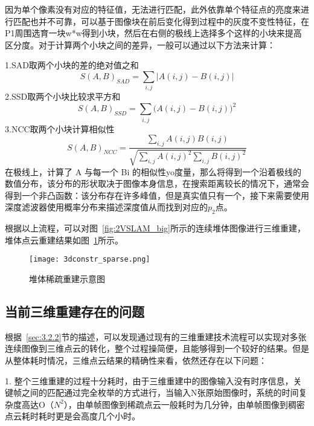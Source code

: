 因为单个像素没有对应的特征值，无法进行匹配，此外依靠单个特征点的亮度来进行匹配也并不可靠，可以基于图像块在前后变化得到过程中的灰度不变性特征，在P1周围选育一块w*w得到小块，然后在右侧的极线上选择多个这样的小块来提高区分度。对于计算两个小块之间的差异，一般可以通过以下方法来计算：

1.SAD取两个小块的差的绝对值之和
\begin{equation}
  S{(A,B)}_{SAD}=\sum_{i,j}\left|A(i,j)-B(i,j)\right|
\end{equation}
2.SSD取两个小块比较求平方和
\begin{equation}
S{(A,B)}_{SSD}=\sum_{i,j}(A(i,j)-B{(i,j))}^2
\end{equation}
3.NCC取两个小块计算相似性
\begin{equation}
  S{(A,B)}_{NCC}=\frac{{\displaystyle\sum_{i,j}}A(i,j)B(i,j)}{\sqrt{{\displaystyle\sum_{i,j}}A{(i,j)}^2\underset{i,j}\sum B{(i,j)}^2}}
\end{equation}
在极线上，计算了 A 与每一个 Bi 的相似性yo度量，那么将得到一个沿着极线的数值分布，该分布的形状取决于图像本身信息，在搜索距离较长的情况下，通常会得到一个非凸函数：该分布存在许多峰值，但是真实值只有一个，接下来需要使用深度滤波器使用概率分布来描述深度值从而找到对应的$p_2$点。

根据以上流程，可以对图~\ref{fig:2VSLAM_big}所示的连续堆体图像进行三维重建，堆体点云重建结果如图~\ref{fig:3dconstr_sparse}所示。
\begin{figure}[H] %
  \centering
  \texttt{[image: 3dconstr\_sparse.png]}
  \caption{堆体稀疏重建示意图}
  \label{fig:3dconstr_sparse}
\end{figure}
\subsection{当前三维重建存在的问题}
\label{sec:3.2.3}
根据~\ref{sec:3.2.2}节的描述，可以发现通过现有的三维重建技术流程可以实现对多张连续图像到三维点云的转化，整个过程操简便，且能够得到一个较好的结果。但是从整体耗时情况，三维点云结果的精确性来看，依然还存在以下问题：

1. 整个三维重建的过程十分耗时，由于三维重建中的图像输入没有时序信息，关键帧之间的匹配通过完全枚举的方式进行，当输入N张原始图像时，系统的时间复杂度高达O（$N^2$），由单帧图像到稀疏点云一般耗时为几分钟，由单帧图像到稠密点云耗时耗时更是会高度几个小时。

